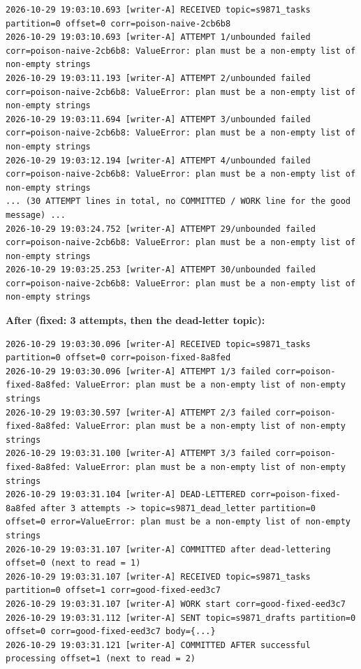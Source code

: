 \documentclass[11pt]{article}
\begin{document}
\begingroup\lstset{basicstyle=\ttfamily\tiny}
\begin{lstlisting}
2026-10-29 19:03:10.693 [writer-A] RECEIVED topic=s9871_tasks partition=0 offset=0 corr=poison-naive-2cb6b8
2026-10-29 19:03:10.693 [writer-A] ATTEMPT 1/unbounded failed corr=poison-naive-2cb6b8: ValueError: plan must be a non-empty list of non-empty strings
2026-10-29 19:03:11.193 [writer-A] ATTEMPT 2/unbounded failed corr=poison-naive-2cb6b8: ValueError: plan must be a non-empty list of non-empty strings
2026-10-29 19:03:11.694 [writer-A] ATTEMPT 3/unbounded failed corr=poison-naive-2cb6b8: ValueError: plan must be a non-empty list of non-empty strings
2026-10-29 19:03:12.194 [writer-A] ATTEMPT 4/unbounded failed corr=poison-naive-2cb6b8: ValueError: plan must be a non-empty list of non-empty strings
... (30 ATTEMPT lines in total, no COMMITTED / WORK line for the good message) ...
2026-10-29 19:03:24.752 [writer-A] ATTEMPT 29/unbounded failed corr=poison-naive-2cb6b8: ValueError: plan must be a non-empty list of non-empty strings
2026-10-29 19:03:25.253 [writer-A] ATTEMPT 30/unbounded failed corr=poison-naive-2cb6b8: ValueError: plan must be a non-empty list of non-empty strings
\end{lstlisting}
\endgroup
\textbf{After (fixed: 3 attempts, then the dead-letter topic):}

\begingroup\lstset{basicstyle=\ttfamily\tiny}
\begin{lstlisting}
2026-10-29 19:03:30.096 [writer-A] RECEIVED topic=s9871_tasks partition=0 offset=0 corr=poison-fixed-8a8fed
2026-10-29 19:03:30.096 [writer-A] ATTEMPT 1/3 failed corr=poison-fixed-8a8fed: ValueError: plan must be a non-empty list of non-empty strings
2026-10-29 19:03:30.597 [writer-A] ATTEMPT 2/3 failed corr=poison-fixed-8a8fed: ValueError: plan must be a non-empty list of non-empty strings
2026-10-29 19:03:31.100 [writer-A] ATTEMPT 3/3 failed corr=poison-fixed-8a8fed: ValueError: plan must be a non-empty list of non-empty strings
2026-10-29 19:03:31.104 [writer-A] DEAD-LETTERED corr=poison-fixed-8a8fed after 3 attempts -> topic=s9871_dead_letter partition=0 offset=0 error=ValueError: plan must be a non-empty list of non-empty strings
2026-10-29 19:03:31.107 [writer-A] COMMITTED after dead-lettering offset=0 (next to read = 1)
2026-10-29 19:03:31.107 [writer-A] RECEIVED topic=s9871_tasks partition=0 offset=1 corr=good-fixed-eed3c7
2026-10-29 19:03:31.107 [writer-A] WORK start corr=good-fixed-eed3c7
2026-10-29 19:03:31.112 [writer-A] SENT topic=s9871_drafts partition=0 offset=0 corr=good-fixed-eed3c7 body={...}
2026-10-29 19:03:31.121 [writer-A] COMMITTED AFTER successful processing offset=1 (next to read = 2)
\end{lstlisting}
\endgroup
\end{document}

